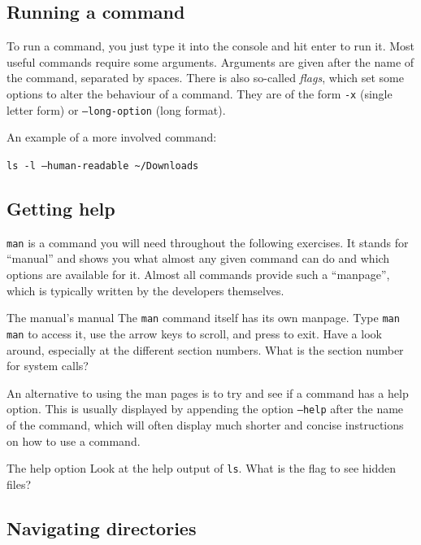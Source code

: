\documentclass{TheAlternativeCourse}
\begin{document}
\subsection{Running a command}

To run a command, you just type it into the console and hit enter to run it.
Most useful commands require some arguments. Arguments are given after the name of
the command, separated by spaces. There is also so-called \emph{flags}, which
set some options to alter the behaviour of a command. They are of the form
\texttt{-x} (single letter form) or \texttt{--long-option} (long format).

An example of a more involved command:

\begin{cmdbox}
\texttt{ls -l --human-readable \textasciitilde/Downloads}
\end{cmdbox}

\subsection{Getting help}

\texttt{man} is a command you will need throughout the following
exercises.  It stands for ``manual'' and shows you what almost any given
command can do and which options are available for it.  Almost all commands
provide such a ``manpage'', which is typically written by the developers
themselves.

\begin{exercisebox}{The manual's manual}
    The \texttt{man} command itself has its own manpage. Type \texttt{man man}
    to access it, use the arrow keys to scroll, and press  to exit.
    Have a look around, especially at the different section numbers.
    What is the section number for system calls?
\end{exercisebox}

An alternative to using the man pages is to try and see if a command has a help
option. This is usually displayed by appending the option \texttt{--help} after
the name of the command, which will often display much shorter and concise
instructions
on how to use a command.

\begin{exercisebox}{The help option}
    Look at the help output of \texttt{ls}. What is the flag to see hidden files?
\end{exercisebox}

\subsection{Navigating directories}
\end{document}
